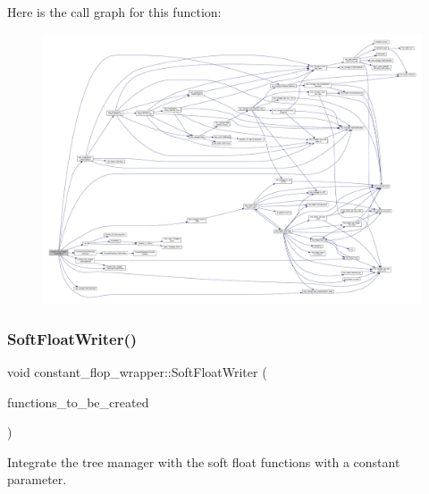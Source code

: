 Here is the call graph for this function\+:
\nopagebreak
\begin{figure}[H]
\begin{center}
\leavevmode
\includegraphics[width=350pt]{d4/da9/classconstant__flop__wrapper_a5b36036f7cc799f0272e7301c79edaf6_cgraph}
\end{center}
\end{figure}
\mbox{\label{classconstant__flop__wrapper_ad0bd18ed1418f981c85cb550f8453462}} 
\subsubsection{\texorpdfstring{Soft\+Float\+Writer()}{SoftFloatWriter()}}
{\footnotesize\ttfamily void constant\+\_\+flop\+\_\+wrapper\+::\+Soft\+Float\+Writer (\begin{DoxyParamCaption}\item[{\hyperlink{custom__set_8hpp_a615bc2f42fc38a4bb1790d12c759e86f}{Custom\+Set}$<$ std\+::pair$<$ std\+::string, \hyperlink{tree__node_8hpp_a3cf5d02292c940f3892425a5b5fdec3c}{tree\+\_\+node\+Const\+Ref} $>$$>$}]{functions\+\_\+to\+\_\+be\+\_\+created }\end{DoxyParamCaption})\hspace{0.3cm}{\ttfamily [protected]}}



Integrate the tree manager with the soft float functions with a constant parameter. 


